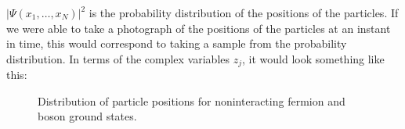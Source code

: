 \documentclass[
  a4paper,
]{scrbook}
\begin{document}
\(\vert\Psi(x_1,\ldots,x_N)\rvert^2\) is the probability distribution of
the positions of the particles. If we were able to take a photograph of
the positions of the particles at an instant in time, this would
correspond to taking a sample from the probability distribution. In
terms of the complex variables \(z_j\), it would look something like
this:

\begin{figure}

\begin{minipage}{0.50\linewidth}



\end{minipage}%
%
\begin{minipage}{0.50\linewidth}



\end{minipage}%

\caption{\label{fig-1d-dist}Distribution of particle positions for
noninteracting fermion and boson ground states.}

\end{figure}%
\end{document}
